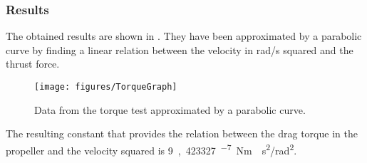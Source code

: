 \subsubsection{Results}
The obtained results are shown in . They have been approximated by a parabolic curve by finding a linear relation between the velocity in rad/s squared and the thrust force.

\begin{figure}[H]
	\centering
	\texttt{[image: figures/TorqueGraph]}
	\caption{Data from the torque test approximated by a parabolic curve.}
	\label{TorqueGraph}
\end{figure}

The resulting constant that provides the relation between the drag torque in the propeller and the velocity squared is \si{9,423327^{-7} Nm\cdot s^2/rad^2}.
